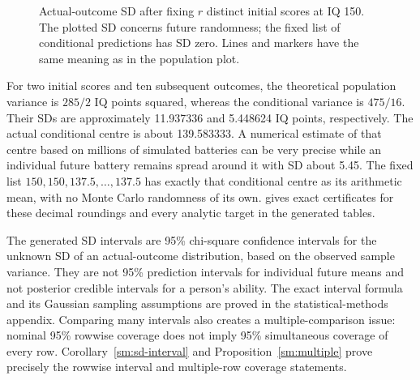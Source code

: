 \begin{figure}[htbp]
\centering
{}
\caption{Actual-outcome SD after fixing \(r\) distinct initial scores at
IQ 150. The plotted SD concerns future randomness; the fixed list of
conditional predictions has SD zero. Lines and markers have the same
meaning as in the population plot.}
\end{figure}

For two initial scores and ten subsequent outcomes, the theoretical
population variance is \(285/2\) IQ points squared, whereas the
conditional variance is \(475/16\). Their SDs are approximately
11.937336 and 5.448624 IQ points, respectively. The actual conditional
centre is about 139.583333. A numerical estimate of that centre based on
millions of simulated batteries can be very precise while an individual
future battery remains spread around it with SD about 5.45. The fixed
list \(150,150,137.5,\ldots,137.5\) has exactly that conditional centre
as its arithmetic mean, with no Monte Carlo randomness of its own.
 gives exact certificates for these decimal
roundings and every analytic target in the generated tables.

The generated SD intervals are 95\% chi-square confidence intervals for
the unknown SD of an actual-outcome distribution, based on the observed
sample variance. They are not 95\% prediction intervals for individual
future means and not posterior credible intervals for a person's ability.
The exact interval formula and its Gaussian sampling assumptions are
proved in the statistical-methods appendix. Comparing many intervals
also creates a multiple-comparison issue: nominal 95\% rowwise coverage
does not imply 95\% simultaneous coverage of every row.
Corollary~\ref{sm:sd-interval} and Proposition~\ref{sm:multiple} prove precisely
the rowwise interval and multiple-row coverage statements.

